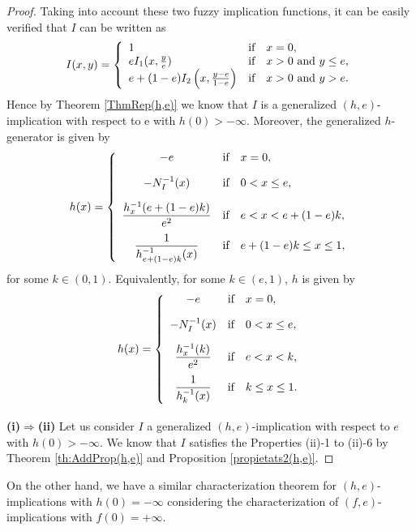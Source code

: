 \begin{proof}
	Taking into account these two fuzzy implication functions, it can be easily verified that $I$ can be written as
	$$I(x,y)= \left\{ \begin{array}{lcl}
		1 &   \hbox{if}  & x=0, \\
		eI_1(x,\frac{y}{e}) &  \hbox{if} & x>0 \hbox{ and } y \leq e, \\
		e+(1-e)I_2\left(x,\frac{y-e}{1-e}\right) &  \hbox{if} & x>0 \hbox{ and } y>e. \\
	\end{array}
	\right.
	$$
	Hence by Theorem \ref{ThmRep(h,e)} we know that $I$ is a generalized $(h,e)$-implication with respect to e with $h(0)> - \infty$. Moreover, the generalized $h$-generator is given by
	$$h(x)=\left\{ \begin{array}{ccl}
		-e &   \hbox{if}  & x=0, \\[1em]
		-N_{I}^{-1}(x) &   \hbox{if}  & 0<x \leq e, \\[1em]
		\displaystyle \frac{h_x^{-1}(e+(1-e)k)}{e^2} &   \hbox{if}  & e<x<e+(1-e)k, \\[1em]
		\displaystyle \frac{1}{h_{e+(1-e)k}^{-1}(x)} &   \hbox{if}  & e+(1-e)k\leq x\leq 1, \\
	\end{array}
	\right.
	$$
	for some $k\in (0,1)$. Equivalently, for some $k\in (e,1)$, $h$ is given by
	$$h(x)=\left\{ \begin{array}{ccl}
		-e &   \hbox{if}  & x=0, \\[1em]
		-N_{I}^{-1}(x) &   \hbox{if}  & 0<x \leq e, \\[1em]
		\displaystyle \frac{h_x^{-1}(k)}{e^2} &   \hbox{if}  & e<x<k, \\[1em]
		\displaystyle \frac{1}{h_{k}^{-1}(x)} &   \hbox{if}  & k\leq x\leq 1. \\[1em]
	\end{array}
	\right.
	$$
	
	{\bf (i)$ \Rightarrow$(ii)} Let us consider $I$ a generalized $(h,e)$-implication with respect to $e$ with $h(0)>-\infty$. We know that $I$ satisfies the Properties (ii)-1 to (ii)-6 by Theorem \ref{th:AddProp(h,e)} and Proposition \ref{propietats2(h,e)}.
\end{proof}

On the other hand, we have a similar characterization theorem for $(h,e)$-implications with $h(0)=-\infty$ considering the characterization of $(f,e)$-implications with $f(0)=+\infty$.\\

